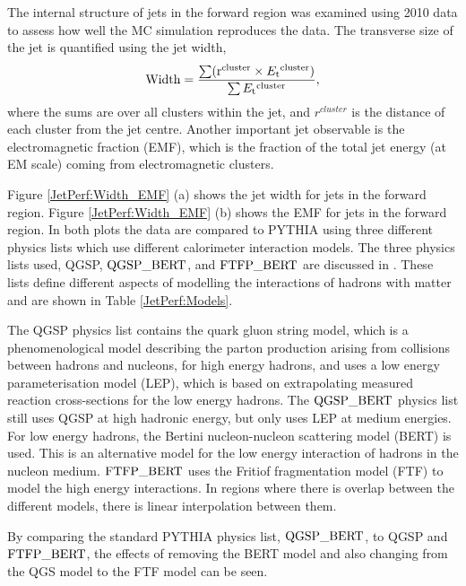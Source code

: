 The internal structure of jets in the forward region was examined using 2010 data to assess how well the MC simulation reproduces the data.
The transverse size of the jet is quantified using the jet width,
\begin{equation}
\rm{Width}=\frac{\sum (r^{cluster} \times \mbox{$E_{\rm t}$}{}^{cluster}) }{\sum \mbox{$E_{\rm t}$}{}^{cluster}},
\label{JetPerf:Width}
\end{equation}
where the sums are over all clusters within the jet, and $r^{cluster}$ is the distance of each cluster from the jet centre.
Another important jet observable is the electromagnetic fraction (EMF), which is the fraction of the total jet energy (at EM scale) coming from electromagnetic clusters.


Figure \ref{JetPerf:Width_EMF} (a) shows the jet width for jets in the forward region.
Figure \ref{JetPerf:Width_EMF} (b) shows the EMF for jets in the forward region.
In both plots the data are compared to PYTHIA using three different physics lists which use different calorimeter interaction models.
The three physics lists used, QGSP, $\rm QGSP\_BERT$, and $\rm FTFP\_BERT$ are discussed in \cite{ref:HadModels}. 
These lists define different aspects of modelling the interactions of hadrons with matter and are shown in Table \ref{JetPerf:Models}.

The QGSP physics list contains the quark gluon string model, which is a phenomenological model describing the parton production arising from collisions between hadrons and nucleons, for high energy hadrons, and uses a low energy parameterisation model (LEP), which is based on extrapolating measured reaction cross-sections for the low energy hadrons.  
The $\rm{QGSP\_BERT}$ physics list still uses QGSP at high hadronic energy, but only uses LEP at medium energies.
For low energy hadrons, the Bertini nucleon-nucleon scattering model (BERT) is used. This is an alternative model for the low energy interaction of hadrons in  the nucleon medium.
$\rm{FTFP\_BERT}$ uses the  Fritiof fragmentation model (FTF) to model the high energy interactions. 
In regions where there is overlap between the different models, there is linear interpolation between them.


By comparing the standard PYTHIA physics list, $\rm QGSP\_BERT$, to QGSP and $\rm FTFP\_BERT$, the effects of removing the BERT model and also changing from the QGS model to the FTF model can be seen.

